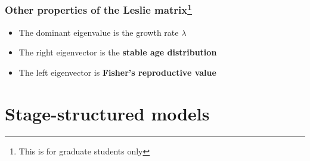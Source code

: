 \documentclass[color=usenames,dvipsnames]{beamer}\usepackage[]{graphicx}\usepackage[]{color}
\begin{document}









\begin{frame}
  \frametitle{Other properties of the Leslie matrix\footnote{This is
      for graduate students only}}
  \Large
  \begin{itemize}[<+->]
    \item The dominant eigenvalue is the growth rate $\lambda$
    \item The right eigenvector is the {\bf stable age distribution}
    \item The left eigenvector is {\bf Fisher's reproductive value}
  \end{itemize}
\end{frame}





\section{Stage-structured models}
\end{document}

